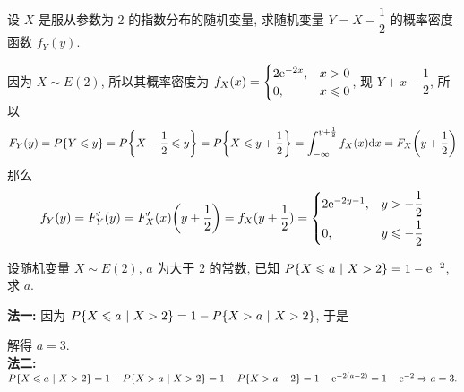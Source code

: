 \begin{example}
    设 $X$ 是服从参数为 2 的指数分布的随机变量, 求随机变量 $Y=X-\dfrac{1}{2}$ 的概率密度函数 $f_Y(y).$
\end{example}
\begin{solution}
    因为 $X\sim E(2)$, 所以其概率密度为 $f_X(x)=\begin{cases}
            2\mathrm{e}^{-2x}, & x>0          \\
            0,         & x\leqslant 0
        \end{cases}$, 现 $Y+x-\dfrac{1}{2}$, 所以 $$F_Y(y)=P\qty{Y\leqslant y}=P\qty{X-\dfrac{1}{2}\leqslant y}=P\qty{X\leqslant y+\dfrac{1}{2}}=\int_{-\infty}^{y+\frac{1}{2}}f_X(x)\dd x=F_X\qty(y+\dfrac{1}{2})$$
    那么 $$f_Y(y)=F'_Y(y)=F'_X(x)\qty(y+\dfrac{1}{2})=f_X(y+\dfrac{1}{2})=\begin{cases}
            2\mathrm{e}^{-2y-1}, & y>-\dfrac{1}{2}          \\[6pt]
            0,           & y\leqslant -\dfrac{1}{2}
        \end{cases}$$
\end{solution}

\begin{example}
    设随机变量 $X\sim E(2)$, $a$ 为大于 2 的常数, 已知 $P\qty{X\leqslant a~|~X>2}=1-\mathrm{e}^{-2}$, 求 $a.$
\end{example}
\begin{solution}
    \textbf{法一: }因为 $P\qty{X\leqslant a~|~X>2}=1-P\qty{X>a~|~X>2}$, 于是
    解得 $a=3.$\\
    \textbf{法二: }$P\qty{X\leqslant a~|~X>2}=1-P\qty{X>a~|~X>2}=1-P\qty{X>a-2}=1-\mathrm{e}^{-2(a-2)}=1-\mathrm{e}^{-2}\Rightarrow a=3.$
\end{solution}

